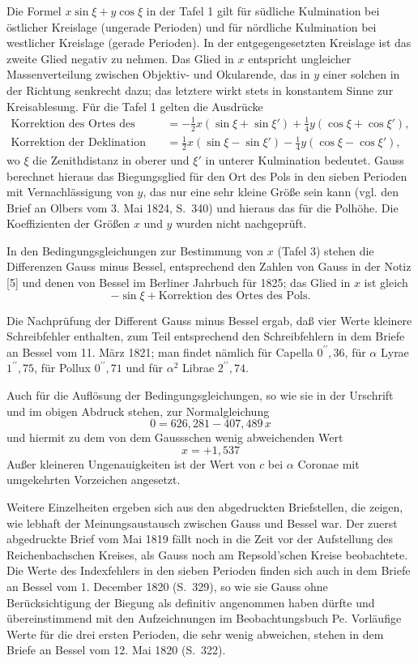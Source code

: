 \documentclass[12pt,a4paper]{article}
\theoremstyle{plain}
\theoremstyle{definition}
\theoremstyle{remark}
\begin{document}
Die Formel $x\sin\xi + y\cos\xi$ in der Tafel 1 gilt f\"ur s\"udliche Kulmination bei \"ostlicher Kreislage (ungerade Perioden) und f\"ur n\"ordliche Kulmination bei westlicher Kreislage (gerade Perioden). In der entgegengesetzten Kreislage ist das zweite Glied negativ zu nehmen. Das Glied in $x$ entspricht ungleicher Massenverteilung zwischen Objektiv- und Okularende, das in $y$ einer solchen in der Richtung senkrecht dazu; das letztere wirkt stets in konstantem Sinne zur Kreisablesung. F\"ur die Tafel 1 gelten die Ausdr\"ucke
\begin{align*}
\text{Korrektion des Ortes des Pols} &= -\tfrac{1}{2}x(\sin\xi + \sin\xi') + \tfrac{1}{4}y(\cos\xi + \cos\xi'), \\
\text{Korrektion der Deklination} &= \tfrac{1}{2}x(\sin\xi - \sin\xi') - \tfrac{1}{4}y(\cos\xi - \cos\xi'),
\end{align*}
wo $\xi$ die Zenithdistanz in oberer und $\xi'$ in unterer Kulmination bedeutet. Gauss berechnet hieraus das Biegungsglied f\"ur den \glqq Ort des Pols in den sieben Perioden\grqq{} mit Vernachl\"assigung von $y$, das \glqq nur eine sehr kleine Gr\"o\ss e sein kann\grqq{} (vgl. den Brief an Olbers vom 3. Mai 1824, S.~340) und hieraus das f\"ur die Polh\"ohe. Die Koeffizienten der Gr\"o\ss en $x$ und $y$ wurden nicht nachgepr\"uft.

In den Bedingungsgleichungen zur Bestimmung von $x$ (Tafel 3) stehen die Differenzen \glqq Gauss minus Bessel\grqq, entsprechend den Zahlen von Gauss in der Notiz [5] und denen von Bessel im Berliner Jahrbuch f\"ur 1825; das Glied in $x$ ist gleich
\[
-\sin\xi + \text{Korrektion des Ortes des Pols}.
\]

Die Nachpr\"ufung der Different \glqq Gauss minus Bessel\grqq{} ergab, da\ss{} vier Werte kleinere Schreibfehler enthalten, zum Teil entsprechend den Schreibfehlern in dem Briefe an Bessel vom 11. M\"arz 1821; man findet n\"amlich f\"ur Capella $0^{\prime\prime}{,}36$, f\"ur $\alpha$ Lyrae $1^{\prime\prime}{,}75$, f\"ur Pollux $0^{\prime\prime}{,}71$ und f\"ur $\alpha^2$ Librae $2^{\prime\prime}{,}74$.

Auch f\"ur die Aufl\"osung der Bedingungsgleichungen, so wie sie in der Urschrift und im obigen Abdruck stehen, zur Normalgleichung
\[
0 = 626{,}281 - 407{,}489\,x
\]
und hiermit zu dem von dem Gaussschen wenig abweichenden Wert
\[
x = +1{,}537
\]
Au\ss er kleineren Ungenauigkeiten ist der Wert von $c$ bei $\alpha$ Coronae mit umgekehrten Vorzeichen angesetzt.

Weitere Einzelheiten ergeben sich aus den abgedruckten Briefstellen, die zeigen, wie lebhaft der Meinungsaustausch zwischen Gauss und Bessel war. Der zuerst abgedruckte Brief vom Mai 1819 f\"allt noch in die Zeit vor der Aufstellung des Reichenbachschen Kreises, als Gauss noch am Repsold'schen Kreise beobachtete. Die Werte des Indexfehlers in den sieben Perioden finden sich auch in dem Briefe an Bessel vom 1. December 1820 (S.~329), so wie sie Gauss ohne Ber\"ucksichtigung der Biegung als definitiv angenommen haben d\"urfte und \"ubereinstimmend mit den Aufzeichnungen im Beobachtungsbuch Pe. Vorl\"aufige Werte f\"ur die drei ersten Perioden, die sehr wenig abweichen, stehen in dem Briefe an Bessel vom 12. Mai 1820 (S.~322).
\end{document}
